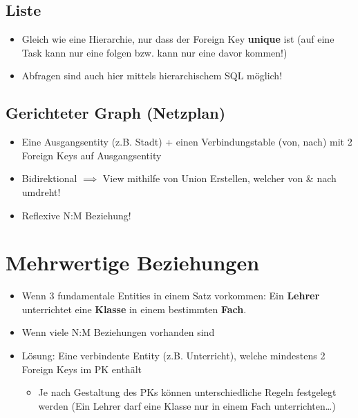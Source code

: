\subsection{Liste}
\begin{itemize}
    \item Gleich wie eine Hierarchie, nur dass der Foreign Key \textbf{unique} ist (auf eine Task kann nur eine folgen bzw. kann nur eine davor kommen!)
    \item Abfragen sind auch hier mittels hierarchischem SQL möglich!
\end{itemize}

\subsection{Gerichteter Graph (Netzplan)}
\begin{itemize}
    \item Eine Ausgangsentity (z.B. Stadt) + einen Verbindungstable (von, nach) mit 2 Foreign Keys auf Ausgangsentity
    \item Bidirektional $\implies$ View mithilfe von Union Erstellen, welcher von \& nach umdreht!
    \item Reflexive N:M Beziehung!
\end{itemize}

\section{Mehrwertige Beziehungen}
\begin{itemize}
    \item Wenn 3 fundamentale Entities in einem Satz vorkommen: Ein \textbf{Lehrer} unterrichtet eine \textbf{Klasse} in einem bestimmten \textbf{Fach}.
    \item Wenn viele N:M Beziehungen vorhanden sind
    \item Lösung: Eine verbindente Entity (z.B. Unterricht), welche mindestens 2 Foreign Keys im PK enthält
    \begin{itemize}
        \item Je nach Gestaltung des PKs können unterschiedliche Regeln festgelegt werden (Ein Lehrer darf eine Klasse nur in einem Fach unterrichten\dots)
    \end{itemize}
\end{itemize}